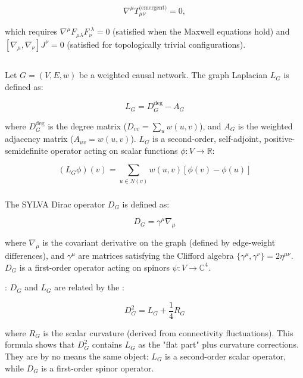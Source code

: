 \documentclass[11pt,a4paper]{article}
\theoremstyle{plain}
\theoremstyle{definition}
\begin{document}
\[\nabla^\mu T^{\text{(emergent)}}_{\mu\nu} = 0,\]

which requires $\nabla^\mu F_{\mu\lambda} F_{\nu}^{\;\lambda} = 0$ (satisfied when the Maxwell equations hold) and $[\nabla_\mu, \nabla_\nu] J^{\nu} = 0$ (satisfied for topologically trivial configurations).

\subsection{\1}

\subsubsection{\1}

Let $G = (V, E, w)$ be a weighted causal network. The graph Laplacian $L_G$ is defined as:

\[L_G = D_G^{\text{deg}} - A_G\]

where $D_G^{\text{deg}}$ is the degree matrix ($D_{vv} = \sum_u w(u,v)$), and $A_G$ is the weighted adjacency matrix ($A_{uv} = w(u,v)$). $L_G$ is a second-order, self-adjoint, positive-semidefinite operator acting on scalar functions $\phi: V \to \mathbb{R}$:

\[(L_G \phi)(v) = \sum_{u \in N(v)} w(u,v) [\phi(v) - \phi(u)]\]

\subsubsection{\1}

The SYLVA Dirac operator $D_G$ is defined as:

\[D_G = \gamma^\mu \nabla_\mu\]

where $\nabla_\mu$ is the covariant derivative on the graph (defined by edge-weight differences), and $\gamma^\mu$ are matrices satisfying the Clifford algebra $\{\gamma^\mu, \gamma^\nu\} = 2\eta^{\mu\nu}$. $D_G$ is a first-order operator acting on spinors $\psi: V \to \mathbb{C}^4$.

\textbf{\1}: $D_G$ and $L_G$ are related by the \textbf{\1}:

\[D_G^2 = L_G + \frac{1}{4} R_G\]

where $R_G$ is the scalar curvature (derived from connectivity fluctuations). This formula shows that $D_G^2$ contains $L_G$ as the "flat part" plus curvature corrections. They are by no means the same object: $L_G$ is a second-order scalar operator, while $D_G$ is a first-order spinor operator.
\end{document}
